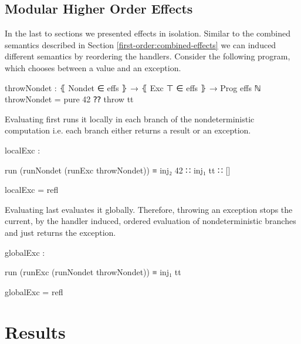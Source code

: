 \subsection{Modular Higher Order Effects}

In the last to sections we presented effects in isolation.
Similar to the combined semantics described in Section
\ref{first-order:combined-effects} we can induced different semantics by
reordering the handlers.
Consider the following program, which chooses between a
 value and an exception.

\begin{code}
throwNondet : ⦃ Nondet ∈ effs ⦄ → ⦃ Exc ⊤ ∈ effs ⦄ → Prog effs ℕ
throwNondet = pure 42 ⁇ throw tt
\end{code}
Evaluating  first runs it locally in each branch of the
nondeterministic computation i.e. each branch either returns a result or an
exception. 
\begin{center}
\begin{code}
localExc : 
\end{code}
\begin{code}[inline]
 run (runNondet (runExc throwNondet)) ≡ inj₂ 42 ∷ inj₁ tt ∷ []
\end{code}
\begin{code}
localExc = refl
\end{code}
\end{center}
Evaluating  last evaluates it globally.
Therefore, throwing an exception stops the current, by the 
handler induced, ordered evaluation of nondeterministic branches and just
returns the exception.
\begin{center}
\begin{code}
globalExc : 
\end{code}
\begin{code}[inline]
 run (runExc (runNondet throwNondet)) ≡ inj₁ tt
\end{code}
\begin{code}
globalExc = refl
\end{code}
\end{center}


\section{Results}

